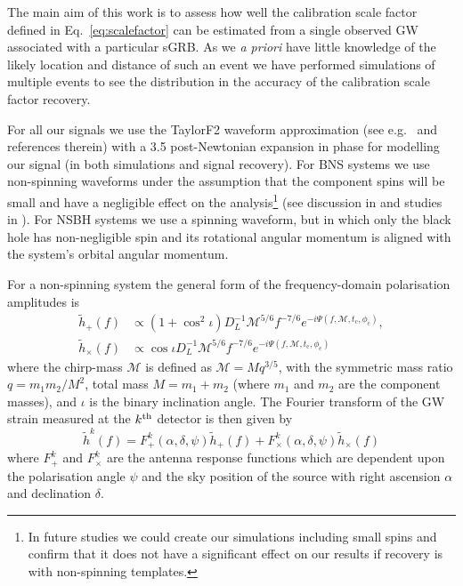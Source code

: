 \documentclass[prd, twocolumn, lengthcheck, superscriptaddress, showpacs, letterpaper, nofootinbib]{revtex4-1}
\newcommand{\gws}{\tilde{h}}
\begin{document}
The main aim of this work is to assess how well the calibration scale factor
defined in Eq.~\ref{eq:scalefactor} can be estimated from a single observed
\ac{GW} associated with a particular \ac{sGRB}. As we {\it a priori} have
little knowledge of the likely location and distance of such an event we have
performed simulations of multiple events to see the distribution in the accuracy of the calibration 
scale factor recovery.

For all our signals we use the TaylorF2 waveform approximation (see e.g.~\cite{2009PhRvD..80h4043B}
and references therein) with a 3.5 post-Newtonian expansion in phase for
modelling our signal (in both simulations and signal recovery).  For \ac{BNS}
systems we use non-spinning waveforms under the assumption that the component spins will be small 
and have a negligible effect on the analysis\footnote{In future studies we could create our 
simulations including small spins and confirm that it does not have a significant effect on our 
results if recovery is with non-spinning templates.} (see discussion in \cite{2014ApJ...795..105S} 
and studies in \cite{2012PhRvD..86h4017B}). For \ac{NSBH} systems we use a spinning waveform, but in 
which only the black hole has non-negligible spin and its rotational angular momentum is aligned 
with the system's orbital angular momentum.

For a non-spinning system the general form of the frequency-domain polarisation
amplitudes is
%
\begin{align}\label{eq:signal} 
\gws_{+}(f) &\propto
\left(1+\cos^{2}\iota\right)D_{L}^{-1} \mathcal{M}^{5/6}f^{-7/6}e^{-i\Psi(f,
\mathcal{M}, t_\mathrm{c}, \phi_{\mathrm{c}})}, \nonumber \\
\gws_{\times}(f) &\propto
\cos{\iota}D_{L}^{-1}\mathcal{M}^{5/6} f^{-7/6}e^{-i\Psi(f, \mathcal{M},
t_\mathrm{c}, \phi_{\mathrm{c}})} 
\end{align}
%
where the chirp-mass $\mathcal{M}$ is defined as $\mathcal{M}=Mq^{3/5}$,
with the symmetric mass ratio $q=m_{1}m_{2}/M^{2}$, total mass
$M=m_{1}+m_{2}$ (where $m_{1}$ and $m_{2}$ are the component masses), and $\iota$ is
the binary inclination angle.  The Fourier transform of the \ac{GW} strain measured
at the $k^{\rm{th}}$ detector is then given by
%
\begin{equation} \label{eq:gravsig} 
\gws^{k}(f) = F_{+}^{k}(\alpha,
\delta, \psi)\gws_{+}(f) + F_{\times}^k(\alpha, \delta,
\psi)\gws_{\times}(f)
\end{equation}
%
where $F^{k}_{+}$ and $F^{k}_{\times}$ are the antenna response functions which
are dependent upon the polarisation angle $\psi$ and the sky position of the
source with right ascension $\alpha$ and declination $\delta$.
\end{document}
